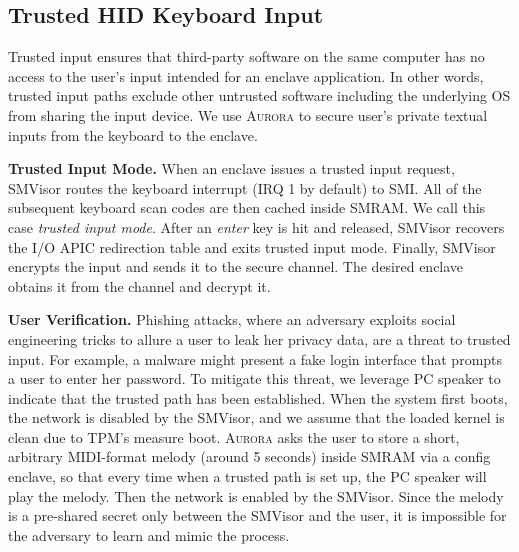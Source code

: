 \subsection{Trusted HID Keyboard Input}\label{input_service}
Trusted input ensures that third-party software on the same computer has no access to the user's input intended for an enclave application. In other words, trusted input paths exclude other untrusted software including the underlying OS from sharing the input device. We use \textsc{Aurora} to secure user's private textual inputs from the keyboard to the enclave.%

\textbf{Trusted Input Mode.}
When an enclave issues a trusted input request, SMVisor routes the keyboard interrupt (IRQ 1 by default) to SMI. All of the subsequent keyboard scan codes are then cached inside SMRAM. We call this case \emph{trusted input mode}. After an \emph{enter} key is hit and released, SMVisor recovers the I/O APIC redirection table and exits trusted input mode. Finally, SMVisor encrypts the input and sends it to the secure channel. The desired enclave obtains it from the channel and decrypt it.

\textbf{User Verification.}
Phishing attacks, where an adversary exploits social engineering tricks to allure a user to leak her privacy data, are a threat to trusted input. For example, a malware might present a fake login interface that prompts a user to enter her password.
To mitigate this threat, we leverage PC speaker to indicate that the trusted path has been established.
When the system first boots, the network is disabled by the SMVisor, and we assume that the loaded kernel is clean due to TPM's measure boot. \textsc{Aurora} asks the user to store a short, arbitrary MIDI-format melody (around 5 seconds) inside SMRAM via a config enclave, so that every time when a trusted path is set up, the PC speaker will play the melody. Then the network is enabled by the SMVisor. Since the melody is a pre-shared secret only between the SMVisor and the user, it is impossible for the adversary to learn and mimic the process.

